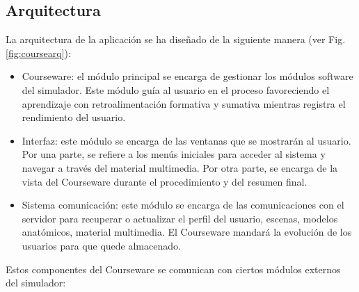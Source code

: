\subsection{Arquitectura}
\label{course:arq}
La arquitectura de la aplicación se ha diseñado de la siguiente manera (ver Fig. \ref{fig:coursearq}):
\begin{itemize}
    \item \ac{Courseware}: el módulo principal se encarga de gestionar los módulos software del simulador. Este módulo guía al usuario en el proceso favoreciendo el aprendizaje con retroalimentación formativa y sumativa mientras registra el rendimiento del usuario.%
    \item Interfaz: este módulo se encarga de las ventanas que se mostrarán al usuario. Por una parte, se refiere a los menús iniciales para acceder al sistema y navegar a través del material multimedia. Por otra parte, se encarga de la vista del \ac{Courseware} durante el procedimiento y del resumen final.

\item Sistema comunicación: este módulo se encarga de las comunicaciones con el servidor para recuperar o actualizar el perfil del usuario, escenas, modelos anatómicos, material multimedia. El \ac{Courseware} mandará la evolución de los usuarios para que quede almacenado.
\end{itemize}


Estos componentes del \ac{Courseware} se comunican con ciertos módulos externos del simulador:

